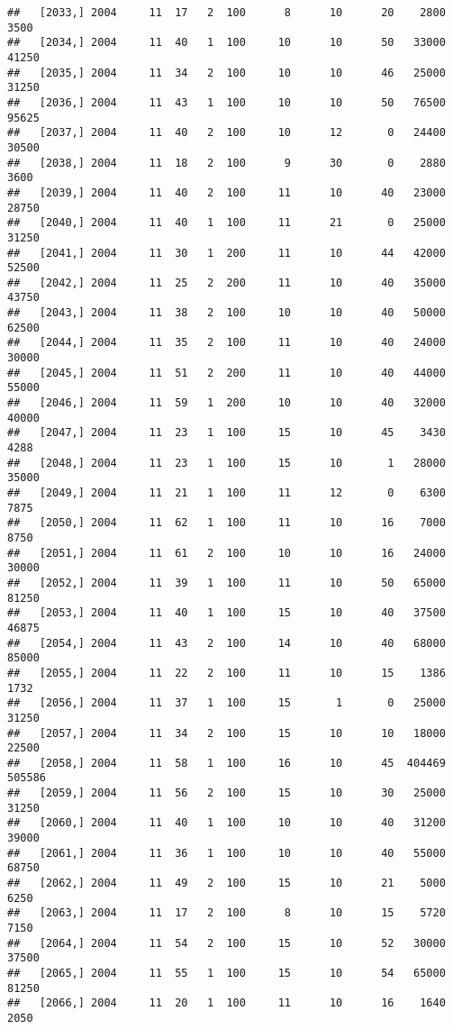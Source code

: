 \documentclass{article}\usepackage[]{graphicx}\usepackage[]{color}
\makeatletter
\newenvironment{kframe}{%
 \def\at@end@of@kframe{}%
 \ifinner\ifhmode%
  \def\at@end@of@kframe{\end{minipage}}%
  \begin{minipage}{\columnwidth}%
 \fi\fi%
 \def\FrameCommand##1{\hskip\@totalleftmargin \hskip-\fboxsep
 \colorbox{shadecolor}{##1}\hskip-\fboxsep
     \hskip-\linewidth \hskip-\@totalleftmargin \hskip\columnwidth}%
 \MakeFramed {\advance\hsize-\width
   \@totalleftmargin\z@ \linewidth\hsize
   \@setminipage}}%
 {\par\unskip\endMakeFramed%
 \at@end@of@kframe}
\newenvironment{knitrout}{}{} %
\makeatother
\begin{document}
\begin{knitrout}
\begin{kframe}
\begin{verbatim}
##   [2033,] 2004     11  17   2  100      8      10      20    2800    3500
##   [2034,] 2004     11  40   1  100     10      10      50   33000   41250
##   [2035,] 2004     11  34   2  100     10      10      46   25000   31250
##   [2036,] 2004     11  43   1  100     10      10      50   76500   95625
##   [2037,] 2004     11  40   2  100     10      12       0   24400   30500
##   [2038,] 2004     11  18   2  100      9      30       0    2880    3600
##   [2039,] 2004     11  40   2  100     11      10      40   23000   28750
##   [2040,] 2004     11  40   1  100     11      21       0   25000   31250
##   [2041,] 2004     11  30   1  200     11      10      44   42000   52500
##   [2042,] 2004     11  25   2  200     11      10      40   35000   43750
##   [2043,] 2004     11  38   2  100     10      10      40   50000   62500
##   [2044,] 2004     11  35   2  100     11      10      40   24000   30000
##   [2045,] 2004     11  51   2  200     11      10      40   44000   55000
##   [2046,] 2004     11  59   1  200     10      10      40   32000   40000
##   [2047,] 2004     11  23   1  100     15      10      45    3430    4288
##   [2048,] 2004     11  23   1  100     15      10       1   28000   35000
##   [2049,] 2004     11  21   1  100     11      12       0    6300    7875
##   [2050,] 2004     11  62   1  100     11      10      16    7000    8750
##   [2051,] 2004     11  61   2  100     10      10      16   24000   30000
##   [2052,] 2004     11  39   1  100     11      10      50   65000   81250
##   [2053,] 2004     11  40   1  100     15      10      40   37500   46875
##   [2054,] 2004     11  43   2  100     14      10      40   68000   85000
##   [2055,] 2004     11  22   2  100     11      10      15    1386    1732
##   [2056,] 2004     11  37   1  100     15       1       0   25000   31250
##   [2057,] 2004     11  34   2  100     15      10      10   18000   22500
##   [2058,] 2004     11  58   1  100     16      10      45  404469  505586
##   [2059,] 2004     11  56   2  100     15      10      30   25000   31250
##   [2060,] 2004     11  40   1  100     10      10      40   31200   39000
##   [2061,] 2004     11  36   1  100     10      10      40   55000   68750
##   [2062,] 2004     11  49   2  100     15      10      21    5000    6250
##   [2063,] 2004     11  17   2  100      8      10      15    5720    7150
##   [2064,] 2004     11  54   2  100     15      10      52   30000   37500
##   [2065,] 2004     11  55   1  100     15      10      54   65000   81250
##   [2066,] 2004     11  20   1  100     11      10      16    1640    2050

\end{verbatim}
\end{kframe}
\end{knitrout}
\end{document}
